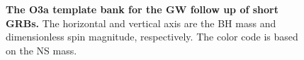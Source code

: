 \documentclass[binding=0.6cm, LaM]{sapthesis}
\begin{document}
        \begin{figure}[t]
          \noindent
          \label{banktest}
          \centering
          \caption{{\bf The O3a template bank for the GW follow up of short GRBs.} The horizontal and vertical axis are the BH mass and dimensionless spin magnitude, respectively.  The color code is based on the NS mass.}
          \label{fig:banktest}
        \end{figure}
\end{document}
